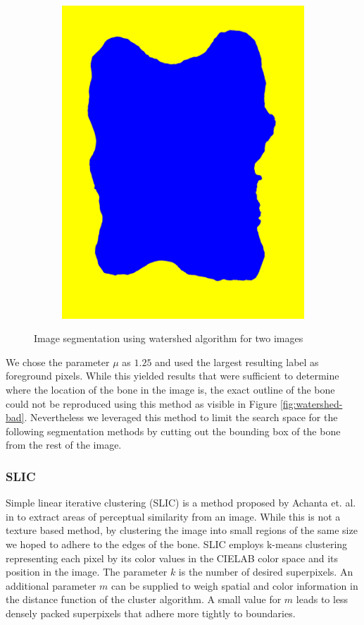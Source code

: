 \documentclass[pdftex,12pt,a4paper]{report}
\begin{document}
\begin{figure}[h]
\begin{subfigure}[b]{0.24\textwidth}
		\includegraphics[width=.9\linewidth]{img/segmentation/bad/watershed/segmented.jpg}
		\subcaption*{}
		\label{}
	\end{subfigure}
	\caption{Image segmentation using watershed algorithm for two images}
	\label{fig:watershed}
\end{figure}

We chose the parameter $\mu$ as $1.25$ and used the largest resulting label as foreground pixels. While this yielded results that were sufficient to determine where the  location of the bone in the image is, the exact outline of the bone could not be reproduced using this method as visible in Figure \ref{fig:watershed-bad}. Nevertheless we leveraged this method to limit the search space for the following segmentation methods by cutting out the bounding box of the bone from the rest of the image.

\subsubsection{SLIC}

Simple linear iterative clustering (SLIC) is a method proposed by Achanta et. al. in \cite{achanta2012slic} to extract areas of perceptual similarity from an image. While this is not a texture based method, by clustering the image into small regions of the same size we hoped to adhere to the edges of the bone. SLIC employs k-means clustering representing each pixel by its color values in the CIELAB color space and its position in the image. The parameter $k$ is the number of desired superpixels. An additional parameter $m$ can be supplied to weigh spatial and color information in the distance function of the cluster algorithm. A small value for $m$ leads to less densely packed superpixels that adhere more tightly to boundaries.
\end{document}
